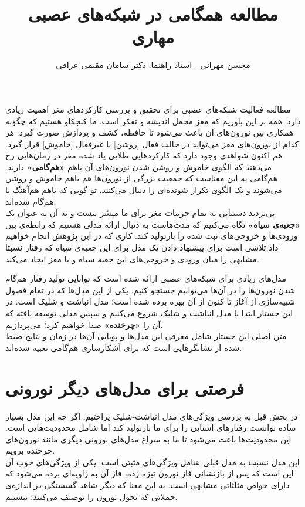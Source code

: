 \documentclass[12pt,onecolumn,a4paper]{book}
\begin{document}
\title{مطالعه همگامی در شبکه‌های عصبی مهاری} 
\author{محسن مهرانی - استاد راهنما: دکتر سامان مقیمی عراقی}
\date{}
\maketitle
\tableofcontents
\newpage
{}
مطالعه فعالیت شبکه‌های عصبی برای تحقیق و بررسی کارکردهای مغز اهمیت زیادی دارد. همه بر این باوریم که مغز محمل اندیشه و تفکر است. ما کنجکاو هستیم که چگونه همکاری بین نورون‌های آن باعث می‌شود تا حافظه، کشف و پردازش صورت گیرد. هر کدام از نورون‌های مغز می‌تواند در حالت فعال [روشن] یا غیرفعال [خاموش] قرار گیرد. هم اکنون شواهدی وجود دارد که کارکردهایی طلایی یاد شده مغز در زمان‌هایی رخ می‌دهند که الگوی خاموش و روشن شدن نورون‌های آن باهم \textbf{«هم‌گامی»} دارند. هم‌گامی به این معناست که جمعیت بزرگی از نورون‌ها هم باهم خاموش و روشن می‌شوند و یک الگوی تکرار شونده‌ای را دنبال می‌کنند. تو گویی که باهم هم‌آهنگ یا هم‌گام شده‌اند.\\

بی‌تردید دستیابی به تمام جزییات مغز برای ما میسّر نیست و به آن به عنوان یک \textbf{«جعبه‌ی سیاه»} نگاه می‌کنیم که مدت‌هاست به دنبال ارائه مدلی هستیم که رابطه‌ی بین ورودی‌ها و خروجی‌های ثبت شده را بازتولید کند. کاری که در این پژوهش انجام خواهیم داد تلاشی است برای پیشنهاد دادن یک مدل برای این جعبه‌ی سیاه که رفتار نسبتا مشابهی را میان ورودی و خروجی‌های این جعبه سیاه و یا مغز ایجاد می‌کند.

مدل‌های زیادی برای شبکه‌های عصبی ارائه شده است که توانایی تولید رفتار هم‌گام شدن نورون‌ها را در آن‌ها می‌توانیم جستجو کنیم. یکی از این مدل‌ها که در تمام فصول شبیه‌سازی از آغاز تا کنون از آن بهره برده شده است؛ مدل انباشت و شلیک است\cite{PhysRevLett.105.158104}. در این جستار ابتدا با مدل انباشت و شلیک شروع می‌کنیم و سپس مدلی توسعه یافته که آن را \textbf{«چرخنده»} صدا خواهیم کرد؛ می‌پردازیم.\\
متن اصلی این جستار شامل معرفی این مدل‌ها و پویایی آن‌ها در زمان و نتایج ضبط شده از نشانگرهایی است که برای آشکارسازی هم‌گامی تعبیه شده‌اند.

%

\section*{فرصتی برای مدل‌های دیگر نورونی}
در بخش قبل به بررسی ویژگی‌های مدل انباشت‌-شلیک پراختیم. اگر چه این مدل بسیار ساده توانست رفتارهای آشنایی را برای ما بازتولید کند اما شامل محدودیت‌هایی است. این محدودیت‌ها باعث می‌شود تا ما به سراغ مدل‌های نورونی دیگری مانند نورون‌های چرخنده برویم.\\
این مدل نسبت به مدل قبلی شامل ویژگی‌های مثبتی است. یکی از ویژگی‌های خوب آن این است که پس از بازنشانی فاز نورون تیزه زده، فاز آن به زاویه‌ای برده می‌شود که دارای خواص مثلثاتی مشابهی است. به این معنا که دیگر شاهد گسستگی در اندازه‌ی جملاتی که تحول نورون را توصیف می‌کنند؛ نیستیم.\\
%
%

\end{document}
